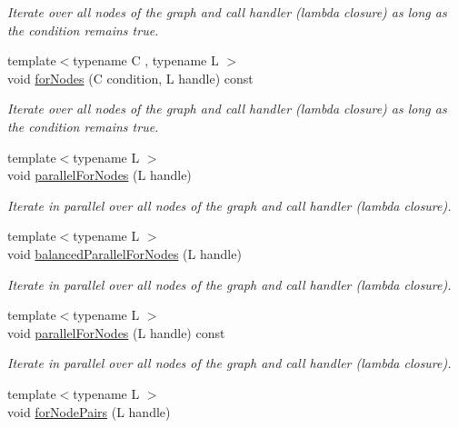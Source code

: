 \begin{DoxyCompactItemize}
\begin{DoxyCompactList}\small\item\em Iterate over all nodes of the graph and call handler (lambda closure) as long as the condition remains true. \end{DoxyCompactList}\item 
{\footnotesize template$<$typename C , typename L $>$ }\\void \hyperlink{class_networ_kit_1_1_graph_a5bd7268cbaac51fd8ffa43a2514f770b}{for\-Nodes} (C condition, L handle) const 
\begin{DoxyCompactList}\small\item\em Iterate over all nodes of the graph and call handler (lambda closure) as long as the condition remains true. \end{DoxyCompactList}\item 
{\footnotesize template$<$typename L $>$ }\\void \hyperlink{class_networ_kit_1_1_graph_a8633f553d0f134474f248e94faf3064d}{parallel\-For\-Nodes} (L handle)
\begin{DoxyCompactList}\small\item\em Iterate in parallel over all nodes of the graph and call handler (lambda closure). \end{DoxyCompactList}\item 
{\footnotesize template$<$typename L $>$ }\\void \hyperlink{class_networ_kit_1_1_graph_a72e5787ce9f3016853cbdde0f961d570}{balanced\-Parallel\-For\-Nodes} (L handle)
\begin{DoxyCompactList}\small\item\em Iterate in parallel over all nodes of the graph and call handler (lambda closure). \end{DoxyCompactList}\item 
{\footnotesize template$<$typename L $>$ }\\void \hyperlink{class_networ_kit_1_1_graph_acd5d60cd2eda52401fe660e172185e01}{parallel\-For\-Nodes} (L handle) const 
\begin{DoxyCompactList}\small\item\em Iterate in parallel over all nodes of the graph and call handler (lambda closure). \end{DoxyCompactList}\item 
{\footnotesize template$<$typename L $>$ }\\void \hyperlink{class_networ_kit_1_1_graph_a498eb0beb05b992d12b246fcf3b76070}{for\-Node\-Pairs} (L handle)

\end{DoxyCompactItemize}
